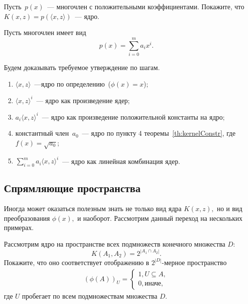 \documentclass[12pt,fleqn]{article}
\begin{document}
\begin{vkProblem}
	Пусть~$p(x)$~--- многочлен с положительными коэффициентами.
	Покажите, что~$K(x, z) = p(\langle x, z \rangle)$~--- ядро.
\end{vkProblem}

\begin{esSolution}
	Пусть многочлен имеет вид
	\[
	p(x) = \sum_{i = 0}^{m} a_i x^i.
	\]
	
	Будем доказывать требуемое утверждение по шагам.
	\begin{enumerate}
		\item $\langle x, z \rangle$~---ядро по определению~($\phi(x) = x$);
		\item $\langle x, z \rangle^i$~--- ядро как произведение ядер;
		\item $a_i \langle x, z \rangle^i$~--- ядро как произведение 
		положительной
		константы на ядро;
		\item константный член~$a_0$~--- ядро по пункту 4 
		теоремы~\ref{th:kernelConstr},
		где~$f(x) = \sqrt{a_0}$;
		\item $\sum_{i = 0}^{m} a_i \langle x, z \rangle^i$~--- ядро
		как линейная комбинация ядер.
	\end{enumerate}
\end{esSolution}

\subsection{Спрямляющие пространства}
	\par Иногда может оказаться полезным знать не только вид ядра $K(x, z),$ но и вид преобразования $\phi(x),$ и наоборот. Рассмотрим данный переход на нескольких примерах.
\begin{vkProblem}
	Рассмотрим ядро на пространстве всех подмножеств конечного множества $D$:
	$$K(A_1, A_2) = 2^{\left| A_1 \cap A_2 \right|}.$$
	Покажите, что оно соответствует отображению в $2^{|D|}$-мерное пространство
	\begin{align*}
		\left( \phi(A) \right)_U = \begin{cases}
			1, U \subseteq A,\\
			0, \text{иначе,}
		\end{cases}
	\end{align*}
	где $U$ пробегает по всем подмножествам множества $D$.
\end{vkProblem}
\end{document}
